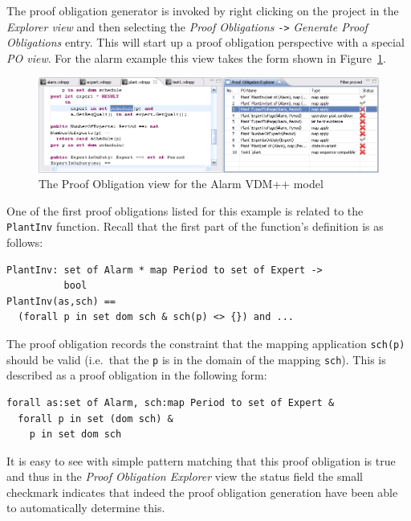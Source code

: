 The proof obligation generator is invoked by right clicking on the
project in the \emph{Explorer view} and then selecting the \emph{Proof
  Obligations} \texttt{->} \emph{Generate Proof Obligations}
entry. This will start up a proof obligation perspective with a
special \emph{PO view}. For the alarm example this view takes the form
shown in Figure~\ref{fig:POview}.

\begin{figure}[htbp]
\begin{center}
\includegraphics[width=4.5in]{figures/POview}
\caption{The Proof Obligation view for the Alarm VDM++ model\label{fig:POview}}
\end{center}
\end{figure}

One of the first proof obligations listed for this example is related
to the \texttt{PlantInv} function. Recall that the first part of the
function's definition is as follows:

\begin{lstlisting}
PlantInv: set of Alarm * map Period to set of Expert -> 
          bool
PlantInv(as,sch) ==
  (forall p in set dom sch & sch(p) <> {}) and ...
\end{lstlisting}


The proof obligation records the constraint that the mapping application
\texttt{sch(p)} should be valid (i.e.\ that the \texttt{p} is in the
domain of the mapping \texttt{sch}). This is described as a proof
obligation in the following form:

\begin{lstlisting}
forall as:set of Alarm, sch:map Period to set of Expert &
  forall p in set (dom sch) &
    p in set dom sch
\end{lstlisting}
It is easy to see with simple pattern matching that this proof
obligation is true and thus in the \emph{Proof Obligation Explorer}
view the status field the small checkmark indicates that indeed the
proof obligation generation have been able to automatically determine
this. 

